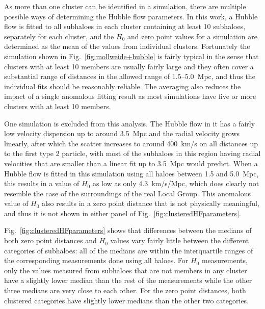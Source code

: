 \documentclass[english, oneside]{HYgradu}
\begin{document}
As more than one cluster can be identified in a simulation, there are multiple possible ways of determining the Hubble flow parameters. In this work, a Hubble flow is fitted to all subhaloes in each cluster containing at least 10 subhaloes, separately for each cluster, and the $H_0$ and zero point values for a simulation are determined as the mean of the values from individual clusters. Fortunately the simulation shown in Fig.~\ref{fig:mollweide+hubble} is fairly typical in the sense that clusters with at least 10 members are usually fairly large and they often cover a substantial range of distances in the allowed range of $1.5$--$5.0$~Mpc, and thus the individual fits should be reasonably reliable. The averaging also reduces the impact of a single anomalous fitting result as most simulations have five or more clusters with at least 10 members.

One simulation is excluded from this analysis. The Hubble flow in it has a fairly low velocity dispersion up to around 3.5~Mpc and the radial velocity grows linearly, after which the scatter increases to around 400~km/s on all distances up to the first type 2 particle, with most of the subhaloes in this region having radial velocities that are smaller than a linear fit up to 3.5~Mpc would predict. When a Hubble flow is fitted in this simulation using all haloes between 1.5 and 5.0~Mpc, this results in a value of $H_0$ as low as only $4.3$~km/s/Mpc, which does clearly not resemble the case of the surroundings of the real Local Group. This anomalous value of $H_0$ also results in a zero point distance that is not physically meaningful, and thus it is not shown in either panel of Fig.~\ref{fig:clusteredHFparameters}.

Fig.~\ref{fig:clusteredHFparameters} shows that differences between the medians of both zero point distances and $H_0$ values vary fairly little between the different categories of subhaloes: all of the medians are within the interquartile ranges of the corresponding measurements done using all haloes. For $H_0$ measurements, only the values measured from subhaloes that are not members in any cluster have a slightly lower median than the rest of the measurements while the other three medians are very close to each other. For the zero point distances, both clustered categories have slightly lower medians than the other two categories.
\end{document}
